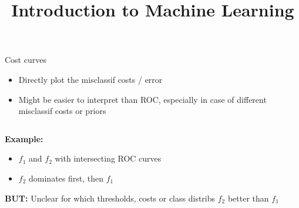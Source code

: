 




\newcommand{\titlefigure}{figure_man/cost-curves-2}
\newcommand{\learninggoals}{
\item Understand cost curves
\item As alternative to ROC curves
}


\title{Introduction to Machine Learning}
\date{}



\sloppy

\begin{vbframe}{Cost curves}

\begin{itemize}
  \item Directly plot the misclassif costs / error 
  \item Might be easier to interpret than ROC, especially in case of 
      different misclassif costs or priors
\end{itemize}

\lz


\begin{columns}%
\begin{column}{0.6\textwidth}
  \small
  \raggedright
  \textbf{Example:} %
  \begin{itemize}
  \item $f_1$ and $f_2$ with intersecting ROC curves 
  \item $f_2$ dominates first, then $f_1$ 
  \end{itemize}

\lz

  \textbf{BUT:} Unclear for which thresholds, costs or class distribs $f_2$ better than $f_1$


\end{column}
\end{columns}
\end{vbframe}

